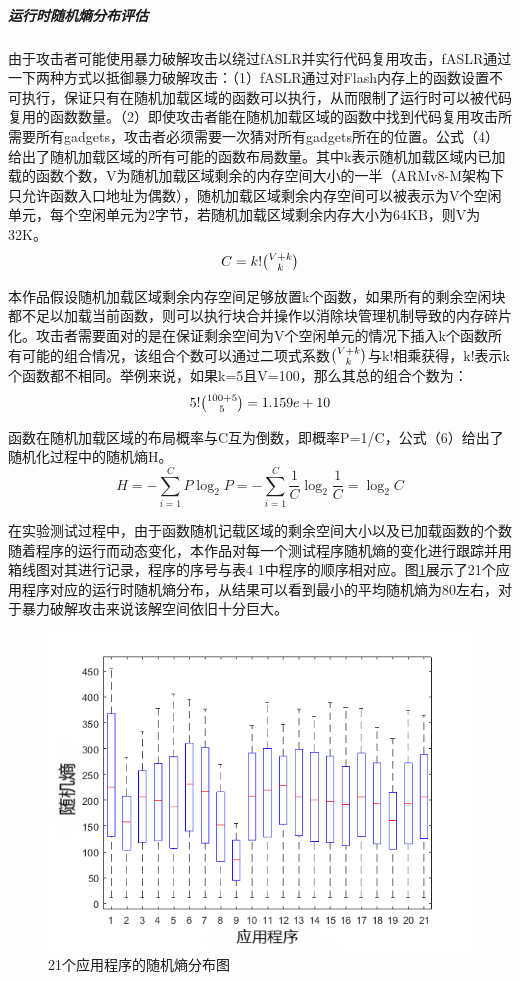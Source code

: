 \documentclass[UTF8,12pt,a4paper]{ctexart}
\numberwithin{figure}{section}
\begin{document}
\subparagraph{运行时随机熵分布评估}
\par 由于攻击者可能使用暴力破解攻击以绕过fASLR并实行代码复用攻击，fASLR通过一下两种方式以抵御暴力破解攻击：（1）fASLR通过对Flash内存上的函数设置不可执行，保证只有在随机加载区域的函数可以执行，从而限制了运行时可以被代码复用的函数数量。（2）即使攻击者能在随机加载区域的函数中找到代码复用攻击所需要所有gadgets，攻击者必须需要一次猜对所有gadgets所在的位置。公式（4）给出了随机加载区域的所有可能的函数布局数量。其中k表示随机加载区域内已加载的函数个数，V为随机加载区域剩余的内存空间大小的一半（ARMv8-M架构下只允许函数入口地址为偶数），随机加载区域剩余内存空间可以被表示为V个空闲单元，每个空闲单元为2字节，若随机加载区域剩余内存大小为64KB，则V为32K。
\begin{equation}
    C = k!\tbinom{V+k}{k}
\end{equation}
\par 本作品假设随机加载区域剩余内存空间足够放置k个函数，如果所有的剩余空闲块都不足以加载当前函数，则可以执行块合并操作以消除块管理机制导致的内存碎片化。攻击者需要面对的是在保证剩余空间为V个空闲单元的情况下插入k个函数所有可能的组合情况，该组合个数可以通过二项式系数$\tbinom{V+k}{k}$与k!相乘获得，k!表示k个函数都不相同。举例来说，如果k=5且V=100，那么其总的组合个数为：
\begin{equation}
    5!\tbinom{100+5}{5}=1.159e+10
\end{equation}
\par 函数在随机加载区域的布局概率与C互为倒数，即概率P=1/C，公式（6）给出了随机化过程中的随机熵H。
\begin{equation}
    H=-\sum_{i=1}^C P\log_2 P = -\sum_{i=1}^{C} \frac{1}{C}\log_2 \frac{1}{C} = \log_2 C
\end{equation}
\par 在实验测试过程中，由于函数随机记载区域的剩余空间大小以及已加载函数的个数随着程序的运行而动态变化，本作品对每一个测试程序随机熵的变化进行跟踪并用箱线图对其进行记录，程序的序号与表4 1中程序的顺序相对应。图\ref{randomEntropy}展示了21个应用程序对应的运行时随机熵分布，从结果可以看到最小的平均随机熵为80左右，对于暴力破解攻击来说该解空间依旧十分巨大。
\begin{figure}[H]
    \label{randomEntropy}
    \centering
    \includegraphics[scale=0.7]{graph/randomEntropy.png}
    \caption{21个应用程序的随机熵分布图}
\end{figure}
\end{document}
